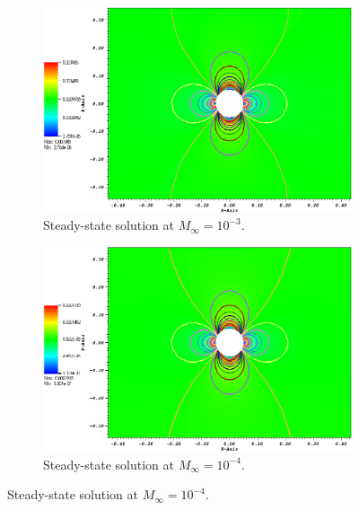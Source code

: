 \documentclass[preprint,10pt]{elsarticle}
\begin{document}
\begin{figure}[H]
        \centering
        \begin{subfigure}[b]{0.495\textwidth}
                \centering
                \includegraphics[width=\textwidth]{CylinderMach1em3ZoomIn.png}
                \caption{Steady-state solution at $M_\infty=10^{-3}$.}
                \label{fig:cyl_1em3}
        \end{subfigure}%
        \begin{subfigure}[b]{0.495\textwidth}
                \centering
                \includegraphics[width=\textwidth]{CylinderMach1em4ZoomIn.png}
                \caption{Steady-state solution at $M_\infty=10^{-4}$.}
                \label{fig:cyl_1em4}
        \end{subfigure}    

\end{figure}
\end{document}
